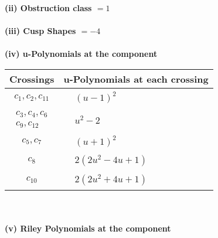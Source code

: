 \documentclass[1p]{elsarticle_modified}
\theoremstyle{definition}
\begin{document}
\flushleft \textbf{(ii) Obstruction class $= 1$}\\~\\
\flushleft \textbf{(iii) Cusp Shapes $= -4$}\\~\\
\newpage\renewcommand{\arraystretch}{1}
\flushleft \textbf{(iv) u-Polynomials at the component}\newline \\
\begin{tabular}{m{50pt}|m{274pt}}
Crossings & \hspace{64pt}u-Polynomials at each crossing \\
\hline $$\begin{aligned}c_{1},c_{2},c_{11}\end{aligned}$$&$\begin{aligned}
&(u-1)^2
\end{aligned}$\\
\hline $$\begin{aligned}c_{3},c_{4},c_{6}\\c_{9},c_{12}\end{aligned}$$&$\begin{aligned}
&u^2-2
\end{aligned}$\\
\hline $$\begin{aligned}c_{5},c_{7}\end{aligned}$$&$\begin{aligned}
&(u+1)^2
\end{aligned}$\\
\hline $$\begin{aligned}c_{8}\end{aligned}$$&$\begin{aligned}
&2(2 u^2-4 u+1)
\end{aligned}$\\
\hline $$\begin{aligned}c_{10}\end{aligned}$$&$\begin{aligned}
&2(2 u^2+4 u+1)
\end{aligned}$\\
\hline
\end{tabular}\\~\\
\newpage\renewcommand{\arraystretch}{1}
\flushleft \textbf{(v) Riley Polynomials at the component}\newline \\
\end{document}
